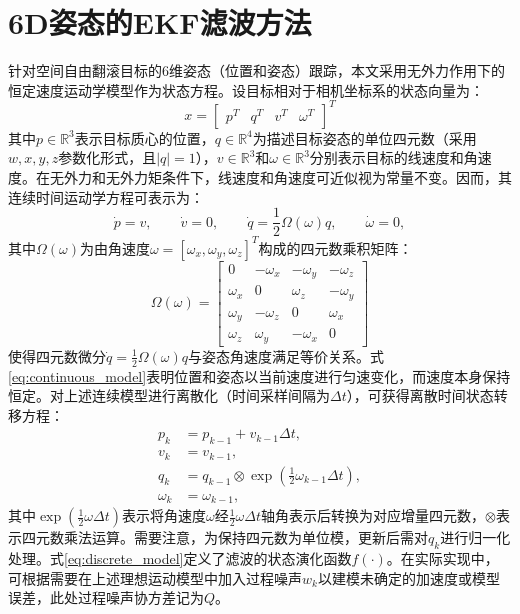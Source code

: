 \section{6D姿态的EKF滤波方法}

针对空间自由翻滚目标的6维姿态（位置和姿态）跟踪，本文采用无外力作用下的恒定速度运动学模型作为状态方程。设目标相对于相机坐标系的状态向量为：
\begin{equation}
	x = \begin{bmatrix}
		p^T & q^T & v^T & \omega^T
	\end{bmatrix}^T
\end{equation}
其中$p \in \mathbb{R}^3$表示目标质心的位置，$q \in \mathbb{R}^4$为描述目标姿态的单位四元数（采用${w, x, y, z}$参数化形式，且$|q|=1$），$v \in \mathbb{R}^3$和$\omega \in \mathbb{R}^3$分别表示目标的线速度和角速度。在无外力和无外力矩条件下，线速度和角速度可近似视为常量不变。因而，其连续时间运动学方程可表示为： \begin{equation}\label{eq:continuous_model} \dot{p} = v, \qquad \dot{v} = 0, \qquad \dot{q} = \frac{1}{2}\Omega(\omega)q, \qquad \dot{\omega} = 0, \end{equation} 其中$\Omega(\omega)$为由角速度$\omega=[\omega_x,\omega_y,\omega_z]^T$构成的四元数乘积矩阵：
\begin{equation}
	\Omega(\omega) = 
	\begin{bmatrix}
		0        & -\omega_x & -\omega_y & -\omega_z \\
		\omega_x & 0         & \omega_z  & -\omega_y \\
		\omega_y & -\omega_z & 0         & \omega_x  \\
		\omega_z & \omega_y  & -\omega_x & 0 
	\end{bmatrix}
\end{equation}
使得四元数微分$\dot{q} = \frac{1}{2}\Omega(\omega)q$与姿态角速度满足等价关系。式\eqref{eq:continuous_model}表明位置和姿态以当前速度进行匀速变化，而速度本身保持恒定。对上述连续模型进行离散化（时间采样间隔为$\Delta t$），可获得离散时间状态转移方程： \begin{equation}\label{eq:discrete_model} \begin{aligned} p_{k} &= p_{k-1} + v_{k-1}\Delta t,\\ v_{k} &= v_{k-1},\\ q_{k} &= q_{k-1} \otimes \exp\left( \frac{1}{2}\omega_{k-1}\Delta t \right),\\ \omega_{k} &= \omega_{k-1}, \end{aligned} \end{equation} 其中$\exp(\frac{1}{2}\omega \Delta t)$表示将角速度$\omega$经$\frac{1}{2}\omega \Delta t$轴角表示后转换为对应增量四元数，$\otimes$表示四元数乘法运算。需要注意，为保持四元数为单位模，更新后需对$q_k$进行归一化处理。式\eqref{eq:discrete_model}定义了滤波的状态演化函数$f(\cdot)$。在实际实现中，可根据需要在上述理想运动模型中加入过程噪声$w_k$以建模未确定的加速度或模型误差，此处过程噪声协方差记为$Q$。

